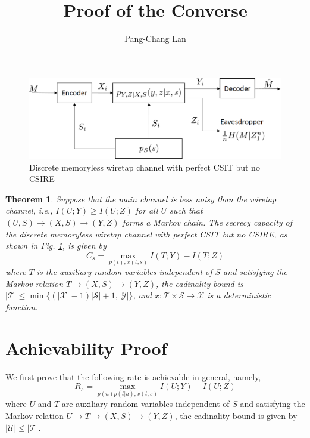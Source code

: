 \documentclass[12pt, Draft, onecolumn]{IEEEtran}
\def\ie{{\it i.e., }}
\def\calS{{\mathcal{S}}}
\def\calU{{\mathcal{U}}}
\def\calX{{\mathcal{X}}}
\def\calY{{\mathcal{Y}}}
\def\calT{{\mathcal{T}}}
\newtheorem{theorem}{Theorem}
\begin{document}
\title{Proof of the Converse}
\author{Pang-Chang Lan}
\maketitle

\begin{figure}[h]
\centering
\includegraphics[scale=.6]{figs/secrecy_noCSIR_channel}
\caption{Discrete memoryless wiretap channel with perfect CSIT but no CSIRE}
\label{fig.secrecy_noCSIR_channel}
\end{figure}

\begin{theorem}
Suppose that the main channel is less noisy than the wiretap channel, \ie $I(U;Y)\geq I(U;Z)$ for all $U$ such that $(U,S)\rightarrow (X,S)\rightarrow (Y,Z)$ forms a Markov chain. The secrecy capacity of the discrete memoryless wiretap channel with perfect CSIT but no CSIRE, as shown in Fig. \ref{fig.secrecy_noCSIR_channel}, is given by
\begin{equation}
C_s = \max_{p(t),x(t,s)} I(T;Y)-I(T;Z)
\end{equation}
where $T$ is the auxiliary random variables independent of $S$ and satisfying the Markov relation $T\rightarrow (X,S)\rightarrow (Y,Z)$, the cadinality bound is $|\calT|\leq \min\{(|\calX|-1)|\calS|+1,|\calY|\}$, and $x:\calT\times\calS\rightarrow\calX$ is a deterministic function.
\end{theorem}

\section{Achievability Proof}
We first prove that the following rate is achievable in general, namely,
\begin{equation}\label{eq.achievable}
R_s = \max_{p(u)p(t|u),x(t,s)} I(U;Y)-I(U;Z)
\end{equation}
where $U$ and $T$ are auxiliary random variables independent of $S$ and satisfying the Markov relation $U\rightarrow T\rightarrow (X,S)\rightarrow (Y,Z)$, the cadinality bound is given by $|\calU|\leq |\calT|$.
\end{document}
